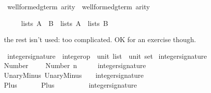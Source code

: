 \begin{isabellebody}
\isamarkupfalse%
\isamarkupfalse%
\isamarkuptrue%
\isamarkupfalse%
\isamarkuptrue%
\isamarkupfalse%
\isanewline
\isanewline
\isanewline
\isamarkupfalse%
\ {\isachardoublequote}well{\isacharunderscore}formed{\isacharunderscore}gterm{\isacharprime}\ arity\ {\isasymsubseteq}\ well{\isacharunderscore}formed{\isacharunderscore}gterm\ arity{\isachardoublequote}\isanewline
\isamarkupfalse%
\isamarkupfalse%
\isamarkuptrue%
\isamarkupfalse%
\isamarkuptrue%
\isamarkupfalse%
\isamarkupfalse%
%
\begin{isamarkuptext}%
\begin{isabelle}%
\ \ \ \ \ lists\ {\isacharparenleft}A\ {\isasyminter}\ B{\isacharparenright}\ {\isacharequal}\ lists\ A\ {\isasyminter}\ lists\ B%
\end{isabelle}%
\end{isamarkuptext}%
\isamarkuptrue%
%
\begin{isamarkuptext}%
the rest isn't used: too complicated.  OK for an exercise though.%
\end{isamarkuptext}%
\isamarkuptrue%
\ integer{\isacharunderscore}signature\ {\isacharcolon}{\isacharcolon}\ {\isachardoublequote}{\isacharparenleft}integer{\isacharunderscore}op\ {\isacharasterisk}\ {\isacharparenleft}unit\ list\ {\isacharasterisk}\ unit{\isacharparenright}{\isacharparenright}\ set{\isachardoublequote}\isanewline
\isamarkupfalse%
\ {\isachardoublequote}integer{\isacharunderscore}signature{\isachardoublequote}\isanewline
{}\isanewline
Number{\isacharcolon}\ \ \ \ \ {\isachardoublequote}{\isacharparenleft}Number\ n{\isacharcomma}\ \ \ {\isacharparenleft}{\isacharbrackleft}{\isacharbrackright}{\isacharcomma}\ {\isacharparenleft}{\isacharparenright}{\isacharparenright}{\isacharparenright}\ {\isasymin}\ integer{\isacharunderscore}signature{\isachardoublequote}\isanewline
UnaryMinus{\isacharcolon}\ {\isachardoublequote}{\isacharparenleft}UnaryMinus{\isacharcomma}\ {\isacharparenleft}{\isacharbrackleft}{\isacharparenleft}{\isacharparenright}{\isacharbrackright}{\isacharcomma}\ {\isacharparenleft}{\isacharparenright}{\isacharparenright}{\isacharparenright}\ {\isasymin}\ integer{\isacharunderscore}signature{\isachardoublequote}\isanewline
Plus{\isacharcolon}\ \ \ \ \ \ \ {\isachardoublequote}{\isacharparenleft}Plus{\isacharcomma}\ \ \ \ \ \ \ {\isacharparenleft}{\isacharbrackleft}{\isacharparenleft}{\isacharparenright}{\isacharcomma}{\isacharparenleft}{\isacharparenright}{\isacharbrackright}{\isacharcomma}\ {\isacharparenleft}{\isacharparenright}{\isacharparenright}{\isacharparenright}\ {\isasymin}\ integer{\isacharunderscore}signature{\isachardoublequote}\isanewline

\end{isabellebody}
